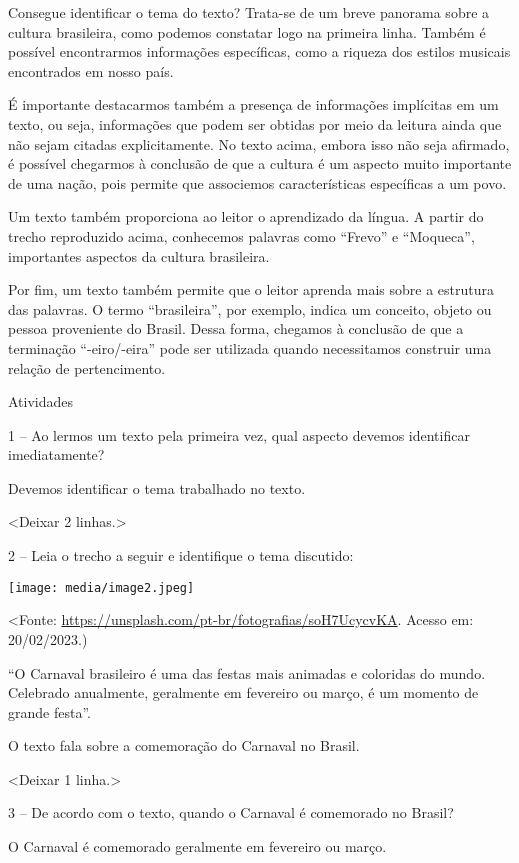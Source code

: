 Consegue identificar o tema do texto? Trata-se de um breve panorama
sobre a cultura brasileira, como podemos constatar logo na primeira
linha. Também é possível encontrarmos informações específicas, como a
riqueza dos estilos musicais encontrados em nosso país.

É importante destacarmos também a presença de informações implícitas em
um texto, ou seja, informações que podem ser obtidas por meio da leitura
ainda que não sejam citadas explicitamente. No texto acima, embora isso
não seja afirmado, é possível chegarmos à conclusão de que a cultura é
um aspecto muito importante de uma nação, pois permite que associemos
características específicas a um povo.

Um texto também proporciona ao leitor o aprendizado da língua. A partir
do trecho reproduzido acima, conhecemos palavras como ``Frevo'' e
``Moqueca'', importantes aspectos da cultura brasileira.

Por fim, um texto também permite que o leitor aprenda mais sobre a
estrutura das palavras. O termo ``brasileira'', por exemplo, indica um
conceito, objeto ou pessoa proveniente do Brasil. Dessa forma, chegamos
à conclusão de que a terminação ``-eiro/-eira'' pode ser utilizada
quando necessitamos construir uma relação de pertencimento.

Atividades

1 -- Ao lermos um texto pela primeira vez, qual aspecto devemos
identificar imediatamente?

Devemos identificar o tema trabalhado no texto.

\textless{}Deixar 2 linhas.\textgreater{}

2 -- Leia o trecho a seguir e identifique o tema discutido:

\texttt{[image: media/image2.jpeg]}

\textless{}Fonte:
\url{https://unsplash.com/pt-br/fotografias/soH7UcycvKA}. Acesso em:
20/02/2023.)

``O Carnaval brasileiro é uma das festas mais animadas e coloridas do
mundo. Celebrado anualmente, geralmente em fevereiro ou março, é um
momento de grande festa''.

O texto fala sobre a comemoração do Carnaval no Brasil.

\textless{}Deixar 1 linha.\textgreater{}

3 -- De acordo com o texto, quando o Carnaval é comemorado no Brasil?

O Carnaval é comemorado geralmente em fevereiro ou março.

